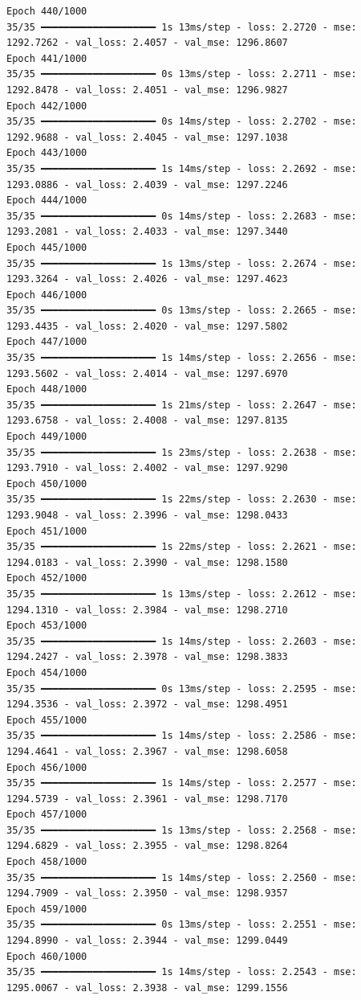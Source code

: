 \documentclass[
  letterpaper,
  DIV=11,
  numbers=noendperiod]{scrreprt}
\begin{document}
\begin{verbatim}
Epoch 440/1000
35/35 ━━━━━━━━━━━━━━━━━━━━ 1s 13ms/step - loss: 2.2720 - mse: 1292.7262 - val_loss: 2.4057 - val_mse: 1296.8607
Epoch 441/1000
35/35 ━━━━━━━━━━━━━━━━━━━━ 0s 13ms/step - loss: 2.2711 - mse: 1292.8478 - val_loss: 2.4051 - val_mse: 1296.9827
Epoch 442/1000
35/35 ━━━━━━━━━━━━━━━━━━━━ 0s 14ms/step - loss: 2.2702 - mse: 1292.9688 - val_loss: 2.4045 - val_mse: 1297.1038
Epoch 443/1000
35/35 ━━━━━━━━━━━━━━━━━━━━ 1s 14ms/step - loss: 2.2692 - mse: 1293.0886 - val_loss: 2.4039 - val_mse: 1297.2246
Epoch 444/1000
35/35 ━━━━━━━━━━━━━━━━━━━━ 0s 14ms/step - loss: 2.2683 - mse: 1293.2081 - val_loss: 2.4033 - val_mse: 1297.3440
Epoch 445/1000
35/35 ━━━━━━━━━━━━━━━━━━━━ 1s 13ms/step - loss: 2.2674 - mse: 1293.3264 - val_loss: 2.4026 - val_mse: 1297.4623
Epoch 446/1000
35/35 ━━━━━━━━━━━━━━━━━━━━ 0s 13ms/step - loss: 2.2665 - mse: 1293.4435 - val_loss: 2.4020 - val_mse: 1297.5802
Epoch 447/1000
35/35 ━━━━━━━━━━━━━━━━━━━━ 1s 14ms/step - loss: 2.2656 - mse: 1293.5602 - val_loss: 2.4014 - val_mse: 1297.6970
Epoch 448/1000
35/35 ━━━━━━━━━━━━━━━━━━━━ 1s 21ms/step - loss: 2.2647 - mse: 1293.6758 - val_loss: 2.4008 - val_mse: 1297.8135
Epoch 449/1000
35/35 ━━━━━━━━━━━━━━━━━━━━ 1s 23ms/step - loss: 2.2638 - mse: 1293.7910 - val_loss: 2.4002 - val_mse: 1297.9290
Epoch 450/1000
35/35 ━━━━━━━━━━━━━━━━━━━━ 1s 22ms/step - loss: 2.2630 - mse: 1293.9048 - val_loss: 2.3996 - val_mse: 1298.0433
Epoch 451/1000
35/35 ━━━━━━━━━━━━━━━━━━━━ 1s 22ms/step - loss: 2.2621 - mse: 1294.0183 - val_loss: 2.3990 - val_mse: 1298.1580
Epoch 452/1000
35/35 ━━━━━━━━━━━━━━━━━━━━ 1s 13ms/step - loss: 2.2612 - mse: 1294.1310 - val_loss: 2.3984 - val_mse: 1298.2710
Epoch 453/1000
35/35 ━━━━━━━━━━━━━━━━━━━━ 1s 14ms/step - loss: 2.2603 - mse: 1294.2427 - val_loss: 2.3978 - val_mse: 1298.3833
Epoch 454/1000
35/35 ━━━━━━━━━━━━━━━━━━━━ 0s 13ms/step - loss: 2.2595 - mse: 1294.3536 - val_loss: 2.3972 - val_mse: 1298.4951
Epoch 455/1000
35/35 ━━━━━━━━━━━━━━━━━━━━ 1s 14ms/step - loss: 2.2586 - mse: 1294.4641 - val_loss: 2.3967 - val_mse: 1298.6058
Epoch 456/1000
35/35 ━━━━━━━━━━━━━━━━━━━━ 1s 14ms/step - loss: 2.2577 - mse: 1294.5739 - val_loss: 2.3961 - val_mse: 1298.7170
Epoch 457/1000
35/35 ━━━━━━━━━━━━━━━━━━━━ 1s 13ms/step - loss: 2.2568 - mse: 1294.6829 - val_loss: 2.3955 - val_mse: 1298.8264
Epoch 458/1000
35/35 ━━━━━━━━━━━━━━━━━━━━ 1s 14ms/step - loss: 2.2560 - mse: 1294.7909 - val_loss: 2.3950 - val_mse: 1298.9357
Epoch 459/1000
35/35 ━━━━━━━━━━━━━━━━━━━━ 0s 13ms/step - loss: 2.2551 - mse: 1294.8990 - val_loss: 2.3944 - val_mse: 1299.0449
Epoch 460/1000
35/35 ━━━━━━━━━━━━━━━━━━━━ 1s 14ms/step - loss: 2.2543 - mse: 1295.0067 - val_loss: 2.3938 - val_mse: 1299.1556

\end{verbatim}
\end{document}
